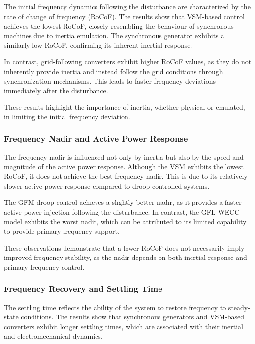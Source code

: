 The initial frequency dynamics following the disturbance are characterized by the rate of change of frequency (RoCoF). The results show that VSM-based control achieves the lowest RoCoF, closely resembling the behaviour of synchronous machines due to inertia emulation. The synchronous generator exhibits a similarly low RoCoF, confirming its inherent inertial response.

In contrast, grid-following converters exhibit higher RoCoF values, as they do not inherently provide inertia and instead follow the grid conditions through synchronization mechanisms. This leads to faster frequency deviations immediately after the disturbance.

These results highlight the importance of inertia, whether physical or emulated, in limiting the initial frequency deviation.

\subsubsection{Frequency Nadir and Active Power Response}

The frequency nadir is influenced not only by inertia but also by the speed and magnitude of the active power response. Although the VSM exhibits the lowest RoCoF, it does not achieve the best frequency nadir. This is due to its relatively slower active power response compared to droop-controlled systems.

The GFM droop control achieves a slightly better nadir, as it provides a faster active power injection following the disturbance. In contrast, the GFL-WECC model exhibits the worst nadir, which can be attributed to its limited capability to provide primary frequency support.

These observations demonstrate that a lower RoCoF does not necessarily imply improved frequency stability, as the nadir depends on both inertial response and primary frequency control.

\subsubsection{Frequency Recovery and Settling Time}

The settling time reflects the ability of the system to restore frequency to steady-state conditions. The results show that synchronous generators and VSM-based converters exhibit longer settling times, which are associated with their inertial and electromechanical dynamics.

